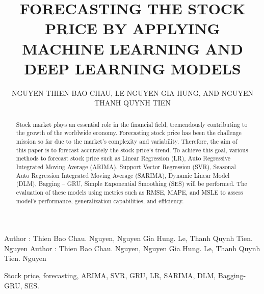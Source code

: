 \documentclass{ieeeojies}
\begin{document}
\title{FORECASTING THE STOCK PRICE BY APPLYING MACHINE LEARNING AND DEEP LEARNING MODELS}

\author{\uppercase{Nguyen Thien Bao Chau},
\uppercase{Le Nguyen Gia Hung, and Nguyen Thanh Quynh Tien}}

\address[1]{Faculty of Information Systems, University of Information Technology, (e-mail: 21521886@gm.uit.edu.vn)}
\address[2]{Faculty of Information Systems, University of Information Technology, (e-mail: 21520890@gm.uit.edu.vn)}
\address[3]{Faculty of Information Systems, University of Information Technology, (e-mail: 21521531@gm.uit.edu.vn)}

\markboth
{Author \headeretal: Thien Bao Chau. Nguyen, Nguyen Gia Hung. Le, Thanh Quynh Tien. Nguyen}
{Author \headeretal: Thien Bao Chau. Nguyen, Nguyen Gia Hung. Le, Thanh Quynh Tien. Nguyen}

\begin{abstract}
Stock market plays an essential role in the financial field, tremendously contributing to the growth of the worldwide economy. Forecasting stock price has been the challenge mission so far due to the market’s complexity and variability. Therefore, the aim of this paper is to forecast accurately the stock price’s trend. To achieve this goal, various methods to forecast stock price such as Linear Regression (LR), Auto Regressive Integrated Moving Average (ARIMA), Support Vector Regression (SVR), Seasonal Auto Regression Integrated Moving Average (SARIMA), Dynamic Linear Model (DLM), Bagging – GRU, Simple Exponential Smoothing (SES) will be performed. The evaluation of these models using metrics such as RMSE, MAPE, and MSLE to assess model’s performance, generalization capabilities, and efficiency.
\end{abstract}

\begin{keywords}
Stock price, forecasting, ARIMA, SVR, GRU, LR, SARIMA, DLM, Bagging-GRU, SES.
\end{keywords}

\titlepgskip=-15pt

\maketitle
\end{document}

